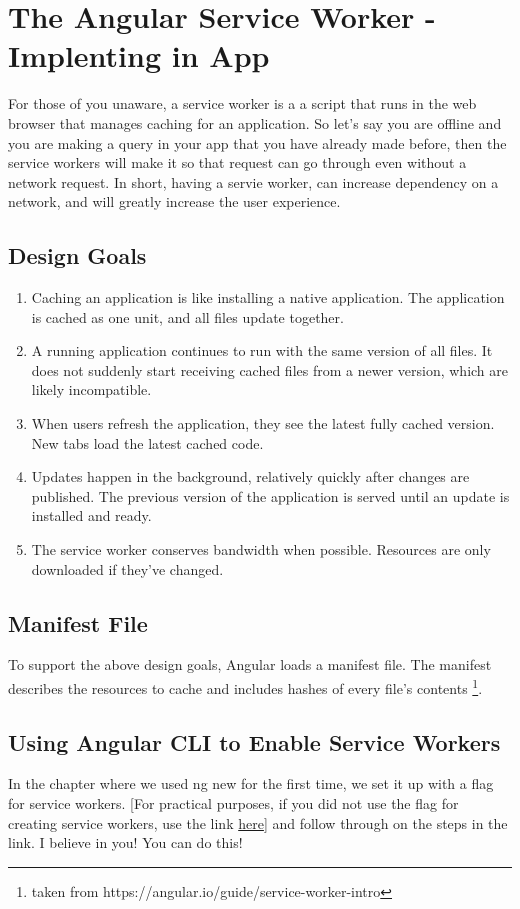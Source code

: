 
\section{ The Angular Service Worker - Implenting in App }

For those of you unaware, a service worker is a a script that runs in the web
browser that manages caching for an application. So let's say you are offline
and you are making a query in your app that you have already made before, then
the service workers will make it so that request can go through even without a
network request. In short, having a servie worker, can increase dependency on a
network, and will greatly increase the user experience.

\subsection{ Design Goals }
\begin{enumerate}
  \item Caching an application is like installing a native application.
  The application is cached as one unit, and all files update together.
  \item A running application continues to run with the same version of all
  files. It does not suddenly start receiving cached files from a newer version,
  which are likely incompatible.
  \item When users refresh the application, they see the latest fully cached
  version. New tabs load the latest cached code.
  \item Updates happen in the background, relatively quickly after changes are
  published. The previous version of the application is served until an update
  is installed and ready.
  \item The service worker conserves bandwidth when possible. Resources are only
  downloaded if they've changed.
\end{enumerate}

\subsection{ Manifest File }
To support the above design goals, Angular loads a manifest file. The manifest
describes the resources to cache and includes hashes of every file's contents
\footnote{taken from https://angular.io/guide/service-worker-intro}.

\subsection{ Using Angular CLI to Enable Service Workers }
In the chapter where we used ng new for the first time, we set it up with a flag
for service workers. [For practical purposes, if you did not use the flag for
creating service workers, use the link \href{https://angular.io/guide/service-worker-getting-started}{here}]
and follow through on the steps in the link. I believe in you! You can do this!

